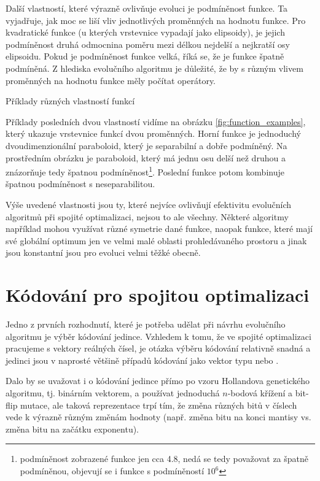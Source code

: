 Další vlastností, které výrazně ovlivňuje evoluci je podmíněnost funkce. Ta vyjadřuje, jak moc se liší vliv jednotlivých proměnných na hodnotu funkce. Pro kvadratické funkce (u kterých vrstevnice vypadají jako elipsoidy), je jejich podmíněnost druhá odmocnina poměru mezi délkou nejdelší a nejkratší osy elipsoidu. Pokud je podmíněnost funkce velká, říká se, že je funkce špatně podmíněná. Z hlediska evolučního algoritmu je důležité, že by s různým vlivem proměnných na hodnotu funkce měly počítat operátory.

\begin{marginfigure}
\centering

\caption{Příklady různých vlastností funkcí}
\label{fig:function_examples}
\end{marginfigure}

Příklady posledních dvou vlastností vidíme na obrázku \ref{fig:function_examples}, který ukazuje vrstevnice funkcí dvou proměnných. Horní funkce je jednoduchý dvoudimenzionální paraboloid, který je separabilní a dobře podmíněný. Na prostředním obrázku je paraboloid, který má jednu osu delší než druhou a znázorňuje tedy špatnou podmíněnost\footnote{podmíněnost zobrazené funkce jen cca 4.8, nedá se tedy považovat za špatně podmíněnou, objevují se i funkce s podmíněností $10^6$}. Poslední funkce potom kombinuje špatnou podmíněnost s neseparabilitou.

Výše uvedené vlastnosti jsou ty, které nejvíce ovlivňují efektivitu evolučních algoritmů při spojité optimalizaci, nejsou to ale všechny. Některé algoritmy například mohou využívat různé symetrie dané funkce, naopak funkce, které mají své globální optimum jen ve velmi malé oblasti prohledávaného prostoru a jinak jsou konstantní jsou pro evoluci velmi těžké obecně.

\section{Kódování pro spojitou optimalizaci}

Jedno z prvních rozhodnutí, které je potřeba udělat při návrhu evolučního algoritmu je výběr kódování jedince. Vzhledem k tomu, že ve spojité optimalizaci pracujeme s vektory reálných čísel, je otázka výběru kódování relativně snadná a jedinci jsou v naprosté většině případů kódování jako vektor typu  nebo .



Dalo by se uvažovat i o kódování jedince přímo po vzoru Hollandova genetického algoritmu, tj. binárním vektorem, a používat jednoduchá $n$-bodová křížení a bit-flip mutace, ale taková reprezentace trpí tím, že změna různých bitů v číslech vede k výrazně různým změnám hodnoty (např. změna bitu na konci mantisy vs. změna bitu na začátku exponentu).

